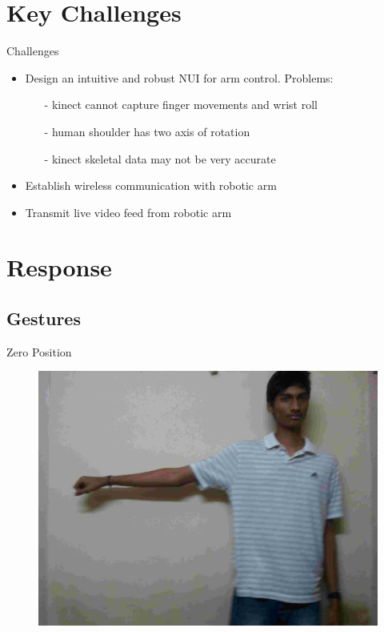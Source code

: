 \documentclass{beamer}
\begin{document}
\section{Key Challenges}
\begin{frame}{Challenges}
\begin{itemize}
\item Design an intuitive and robust NUI for arm control. Problems:
\begin{itemize}
\item[-]kinect cannot capture finger movements and wrist roll
\item[-]human shoulder has two axis of rotation
\item[-]kinect skeletal data may not be very accurate
\end{itemize}
\item Establish wireless communication with robotic arm
\item Transmit live video feed from robotic arm
\end{itemize}
\end{frame}
\section{Response}
\subsection{Gestures}
\begin{frame}{Zero Position}
  \begin{figure}
      \centering
      \includegraphics[scale = .08]{gestures/0.jpg} 
  \end{figure}
\end{frame}
\end{document}

